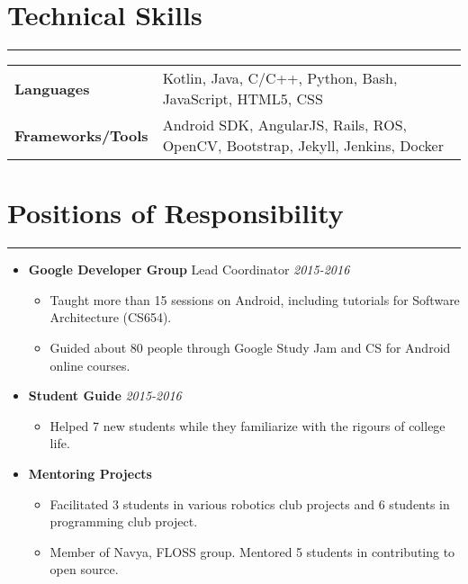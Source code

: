 \documentclass[a4paper]{article}
\begin{document}
\section*{Technical Skills}
\hrule
\vspace{3mm}
\begin{tabular}{@{}m{40mm}m{130mm}@{}}
	\textbf{\textrm{Languages}}        & Kotlin, Java, C/C++, Python, Bash, JavaScript, HTML5, CSS\\
	\textbf{\textrm{Frameworks/Tools}} & Android SDK, AngularJS, Rails, ROS, OpenCV, Bootstrap, Jekyll, Jenkins, Docker\\
\end{tabular}

\section*{Positions of Responsibility}
\hrule
\vspace{3mm}
\begin{itemize}
	\item
	      \textbf{Google Developer Group} Lead Coordinator
	      \hfill \textit{2015-2016}
	      \begin{itemize}
	      	\vspace{-2mm} \setlength\itemsep{-0.7mm}
		\item Taught more than 15 sessions on Android, including tutorials for Software Architecture (CS654).
		\item Guided about 80 people through Google Study Jam and CS for Android online courses.
	      \end{itemize}
	\item
	      \textbf{Student Guide}
	      \hfill \textit{2015-2016}
	      \begin{itemize}
	      	\vspace{-2mm} \setlength\itemsep{-0.7mm}
		\item Helped 7 new students while they familiarize with the rigours of college life.
	      \end{itemize}
	\item
	      \textbf{Mentoring Projects}
	      \begin{itemize}
	      	\vspace{-2mm} \setlength\itemsep{-0.7mm}
	      	\item Facilitated 3 students in various robotics club projects and 6 students in programming club project.
	      	\item Member of Navya, FLOSS group. Mentored 5 students in contributing to open source.
	      \end{itemize}
\end{itemize}
\end{document}
